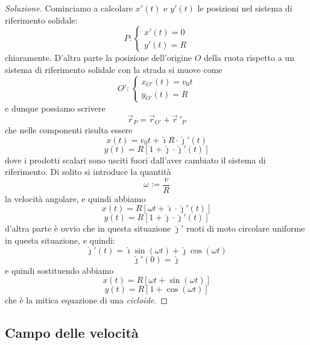 \documentclass[11pt]{scrartcl}
\newcommand{\ihat}{\hat{\imath}}
\newcommand{\jhat}{\hat{\jmath}}
\newcommand{\posit}{\vec{r}}
\begin{document}
	\begin{proof}[Soluzione]
		Cominciamo a calcolare $x'(t)$ e $y'(t)$ le posizioni nel sistema di riferimento solidale:
		$$
		P:\begin{cases}
			x'(t)=0 \\
			y'(t)=R
		\end{cases}
		$$
		chiaramente. D'altra parte la posizione dell'origine $O$ della ruota rispetto a un sistema di riferimento solidale con la strada si muove come
		$$
		O':
		\begin{cases}
			x_{O'}(t)=v_0t \\
			y_{O'}(t)=R
		\end{cases}
		$$
		e dunque possiamo scrivere
		$$\posit_P=\posit_{O'}+\posit\,'_P$$
		che nelle componenti risulta essere
		$$x(t)=v_0t+\ihat R\cdot\jhat'(t)$$
		$$y(t)=R\left[1+\jhat\cdot\jhat'(t)\right]$$
		dove i prodotti scalari sono usciti fuori dall'aver cambiato il sistema di riferimento. Di solito si introduce la quantità 
		$$\omega:=\frac{v}{R}$$
		la velocità angolare, e quindi abbiamo
		$$x(t)=R\left[\omega t+\ihat \cdot\jhat'(t)\right]$$
		$$y(t)=R\left[1+\jhat\cdot\jhat'(t)\right]$$
		d'altra parte è ovvio che in questa situazione $\jhat'$ ruoti di moto circolare uniforme in questa situazione, e quindi: 
		$$\jhat'(t)=\ihat \sin(\omega t)+\jhat \cos(\omega t)$$
		$$\jhat'(0)=\jhat$$
		e quindi sostituendo abbiamo
		$$x(t)=R\left[\omega t + \sin(\omega t)\right]$$
		$$y(t)=R\left[1+\cos(\omega t)\right]$$
		che è la mitica equazione di una \textit{cicloide}.
	\end{proof}
	
	\subsection{Campo delle velocità}
	
\end{document}
